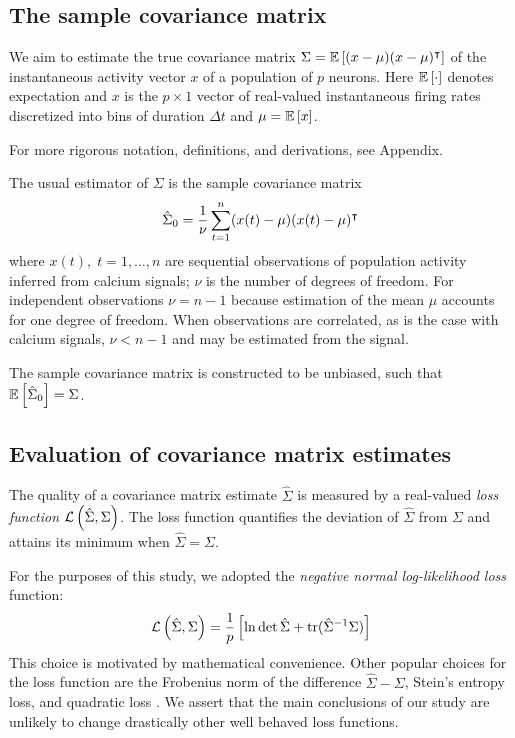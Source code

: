 \subsection*{The sample covariance matrix}
We aim to estimate the true covariance matrix $\Sigma = \mathbb E\left[ (x-\mu)(x-\mu)^\intercal\right]$ of the instantaneous activity vector $x$ of a population of $p$ neurons. Here $\mathbb E\left[ \cdot\right]$ denotes expectation  and $x$ is the $p\times 1$ vector of real-valued instantaneous firing rates discretized into bins of duration $\Delta t$ and $\mu = \mathbb E\left[ x\right]$.  

For more rigorous notation, definitions, and derivations, see Appendix. 

The usual estimator of $\Sigma$ is the sample covariance matrix
\begin{equation}
\hat \Sigma_0 = \frac 1 \nu \sum\limits_{t=1}^n (x(t)-\mu)(x(t)-\mu)^\intercal 
\end{equation}
where $x(t),\;t=1,\ldots,n$ are sequential observations of population activity inferred from calcium signals; $\nu$ is the number of degrees of freedom. For independent observations $\nu=n-1$ because estimation of the mean $\mu$ accounts for one degree of freedom. When observations are correlated, as is the case with calcium signals, $\nu < n-1$ and may be estimated from the signal. 

The sample covariance matrix is constructed to be unbiased, such that $\mathbb E\left[ \hat\Sigma_0\right] = \Sigma$. 

\subsection*{Evaluation of covariance matrix estimates}
The quality of a covariance matrix estimate $\hat\Sigma$ is measured by a real-valued \emph{loss function} $\mathcal L\left(\hat\Sigma,\Sigma\right)$.  The loss function quantifies the deviation of $\hat\Sigma$ from $\Sigma$ and attains its minimum  when $\hat\Sigma = \Sigma$. 

For the purposes of this study, we adopted the \emph{negative normal log-likelihood loss} function:
\begin{equation}\label{eq:loss}
\mathcal L\left(\hat\Sigma,\Sigma\right) = \frac 1 p\left[\ln \det \hat \Sigma + \operatorname{tr}(\hat \Sigma^{-1}\Sigma)\right]
\end{equation}
This choice is motivated by mathematical convenience. Other popular choices for the loss function are the Frobenius norm of the difference $\hat\Sigma-\Sigma$, Stein's entropy loss, and quadratic loss \cite{James:1961,Ledoit:2004,Schafer:2005,Fan:2008}.  We assert that the main conclusions of our study are unlikely to change drastically other well behaved loss functions.

